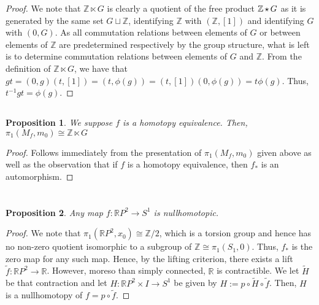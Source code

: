 \documentclass[english]{article}
\newcommand{\RR}{\mathbb{R}}
\newcommand{\ZZ}{\mathbb{Z}}
\newcommand{\prob}[1]{\setcounter{section}{#1-1}\section{}}
\newcommand{\prt}[1]{\setcounter{subsection}{#1-1}\subsection{}}
\newtheorem*{proposition*}{Proposition}
\theoremstyle{remark}
\theoremstyle{definition}
\newcommand{\frp}{\mathop{\large {\mathlarger{\star}}}}
\begin{document}
\begin{proof}
	We note that $\ZZ\ltimes G$ is clearly a quotient of the free product $\ZZ\frp G$ as it is generated by the same set $G\sqcup \ZZ$, identifying $\ZZ$ with $(\ZZ,[1])$ and identifying $G$ with $(0,G)$. As all commutation relations between elements of $G$ or between elements of $\ZZ$ are predetermined respectively by the group structure, what is left is to determine commutation relations between elements of $G$ and $\ZZ$. From the definition of $\ZZ\ltimes G$, we have that $gt=(0,g)(t,[1])=(t,\phi(g))=(t,[1])(0,\phi(g))=t\phi(g)$. Thus, $t^{-1}gt=\phi(g)$.  
\end{proof}
\prt{7} \begin{proposition*} We suppose $f$ is a homotopy equivalence. Then,
$\pi_1(M_f,m_0)\cong \ZZ\ltimes G$
\end{proposition*}
\begin{proof}
Follows immediately from the presentation of $\pi_1(M_f,m_0)$ given above as well as the observation that if $f$ is a homotopy equivalence, then $f_*$ is an automorphism. \end{proof}

\prob{2}
\begin{proposition*}
	Any map $f:\RR P^2\to S^1$ is nullhomotopic.
\end{proposition*}
\begin{proof}
	We note that $\pi_1(\RR P^2,x_0)\cong\ZZ/2$, which is a torsion group and hence has no non-zero quotient isomorphic to a subgroup of $\ZZ\cong \pi_1(S_1,0)$. Thus, $f_*$ is the zero map for any such map. Hence, by the lifting criterion, there exists a lift $\tilde{f}:\RR P^2\to \RR$. However, moreso than simply connected, $\RR$ is contractible. We let $\tilde{H}$ be that contraction and let $H:\RR P^2 \times I\to S^1$ be given by $H:=p\circ \tilde H\circ \tilde f$. Then, $H$ is a nullhomotopy of $f=p\circ \tilde f$. 
\end{proof}
\end{document}
